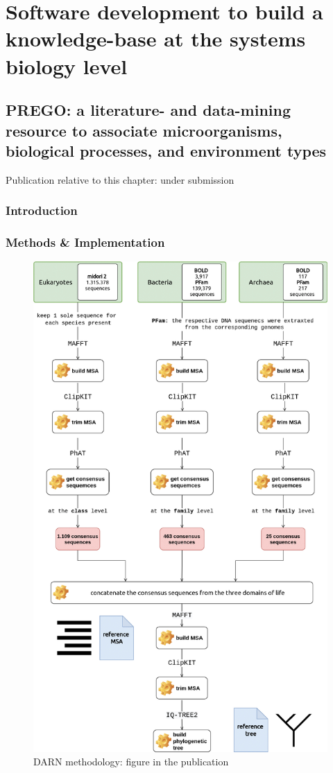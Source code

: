 % 
% 


\chapter{Software development to build a knowledge-base at the systems biology level}
\label{cha:prego}



\section{PREGO: a literature- and data-mining resource to associate microorganisms, biological processes, and environment types}

Publication relative to this chapter: under submission
\subsection{Introduction}

\subsection{Methods \& Implementation}

\begin{figure}[!htbp]
   \centering
   \includegraphics[width=0.75\columnwidth]{figures/darn_methodology.jpg}
   \caption{DARN methodology: figure in the publication}
\end{figure}



